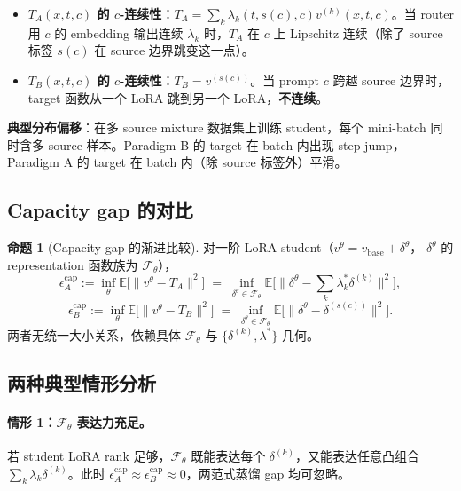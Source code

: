 \documentclass[11pt,a4paper]{article}
\newcommand{\E}{\mathbb{E}}
\theoremstyle{definition}
\newtheorem{proposition}{命题}
\begin{document}
\begin{itemize}[leftmargin=1.5em]
\item \textbf{$T_A(x, t, c)$ 的 $c$-连续性}：$T_A = \sum_k \lambda_k(t, s(c), c) v^{(k)}(x, t, c)$。当 router 用 $c$ 的 embedding 输出连续 $\lambda_k$ 时，$T_A$ 在 $c$ 上 Lipschitz 连续（除了 source 标签 $s(c)$ 在 source 边界跳变这一点）。

\item \textbf{$T_B(x, t, c)$ 的 $c$-连续性}：$T_B = v^{(s(c))}$。当 prompt $c$ 跨越 source 边界时，target 函数从一个 LoRA 跳到另一个 LoRA，\textbf{不连续}。
\end{itemize}

\textbf{典型分布偏移}：在多 source mixture 数据集上训练 student，每个 mini-batch 同时含多 source 样本。Paradigm B 的 target 在 batch 内出现 step jump，Paradigm A 的 target 在 batch 内（除 source 标签外）平滑。

\subsection{Capacity gap 的对比}

\begin{proposition}[Capacity gap 的渐进比较]
\label{prop:capacity}
对一阶 LoRA student（$v^\theta = v_{\text{base}} + \delta^\theta$，
$\delta^\theta$ 的 representation 函数族为 $\mathcal{F}_\theta$），
\begin{equation}
\epsilon_A^{\text{cap}} := \inf_{\theta} \E\!\big[\|v^\theta - T_A\|^2\big] \;=\; \inf_{\delta^\theta \in \mathcal{F}_\theta}\E\!\Big[\Big\|\delta^\theta - \sum_k \lambda_k^* \delta^{(k)}\Big\|^2\Big],
\end{equation}
\begin{equation}
\epsilon_B^{\text{cap}} := \inf_{\theta} \E\!\big[\|v^\theta - T_B\|^2\big] \;=\; \inf_{\delta^\theta \in \mathcal{F}_\theta}\E\!\Big[\Big\|\delta^\theta - \delta^{(s(c))}\Big\|^2\Big].
\end{equation}
两者无统一大小关系，依赖具体 $\mathcal{F}_\theta$ 与
$\{\delta^{(k)}, \lambda^*\}$ 几何。
\end{proposition}

\subsection{两种典型情形分析}

\paragraph{情形 1：$\mathcal{F}_\theta$ 表达力充足。}
若 student LoRA rank 足够，$\mathcal{F}_\theta$ 既能表达每个 $\delta^{(k)}$，又能表达任意凸组合 $\sum_k \lambda_k \delta^{(k)}$。此时 $\epsilon_A^{\text{cap}} \approx \epsilon_B^{\text{cap}} \approx 0$，两范式蒸馏 gap 均可忽略。
\end{document}

